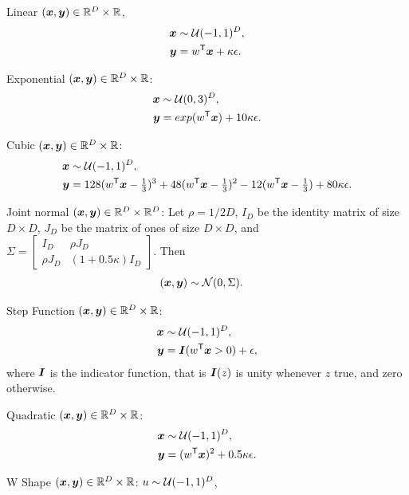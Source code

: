 \documentclass[11pt]{extarticle}
\begin{document}
\setcounter{equation}{0}
\begin{compactenum}
\item Linear $(\boldsymbol{x},\boldsymbol{y}) \in \mathbb{R}^{D} \times \mathbb{R}$,
\begin{align*}
\boldsymbol{x} &\sim \mathcal{U}(-1,1)^{D},\\
\boldsymbol{y} &=w^{\mathsf{T}} \boldsymbol{x}+\kappa\epsilon.
\end{align*}
\item Exponential $(\boldsymbol{x},\boldsymbol{y}) \in \mathbb{R}^{D} \times \mathbb{R}$:
\begin{align*}
\boldsymbol{x} &\sim \mathcal{U}(0,3)^{D}, \\
\boldsymbol{y} &=exp(w^{\mathsf{T}} \boldsymbol{x})+10\kappa\epsilon.
\end{align*}
\item Cubic $(\boldsymbol{x},\boldsymbol{y}) \in \mathbb{R}^{D} \times \mathbb{R}$:
\begin{align*}
\boldsymbol{x} &\sim \mathcal{U}(-1,1)^{D}, \\
\boldsymbol{y} &=128(w^{\mathsf{T}} \boldsymbol{x}-\tfrac{1}{3})^3+48(w^{\mathsf{T}} \boldsymbol{x}-\tfrac{1}{3})^2-12(w^{\mathsf{T}} \boldsymbol{x}-\tfrac{1}{3})+80\kappa\epsilon.
\end{align*}
\item Joint normal $(\boldsymbol{x},\boldsymbol{y}) \in \mathbb{R}^{D} \times \mathbb{R}^{D}$: Let $\rho=1/2D$, $I_{D}$ be the identity matrix of size $D \times D$, $J_{D}$ be the matrix of ones of size $D \times D$, and $\Sigma = \begin{bmatrix} I_{D}&\rho J_{D}\\ \rho J_{D}& (1+0.5\kappa) I_{D} \end{bmatrix}$. Then
\begin{align*}
(\boldsymbol{x}, \boldsymbol{y}) &\sim \mathcal{N}(0, \Sigma).
\end{align*}
\item Step Function $(\boldsymbol{x},\boldsymbol{y}) \in \mathbb{R}^{D} \times \mathbb{R}$:
\begin{align*}
\boldsymbol{x} &\sim \mathcal{U}(-1,1)^{D},\\
\boldsymbol{y} &=\boldsymbol{I}(w^{\mathsf{T}} \boldsymbol{x}>0)+\epsilon,
\end{align*}
where $\boldsymbol{I}$ is the indicator function, that is $\boldsymbol{I}(z)$ is unity whenever $z$ true, and zero otherwise.
\item Quadratic $(\boldsymbol{x},\boldsymbol{y}) \in \mathbb{R}^{D} \times \mathbb{R}$:
\begin{align*}
\boldsymbol{x} &\sim \mathcal{U}(-1,1)^{D},\\
\boldsymbol{y}&=(w^{\mathsf{T}} \boldsymbol{x})^2+0.5\kappa\epsilon.
\end{align*}
\item W Shape $(\boldsymbol{x},\boldsymbol{y}) \in \mathbb{R}^{D} \times \mathbb{R}$:  $u \sim \mathcal{U}(-1,1)^{D}$,

\end{compactenum}
\end{document}
